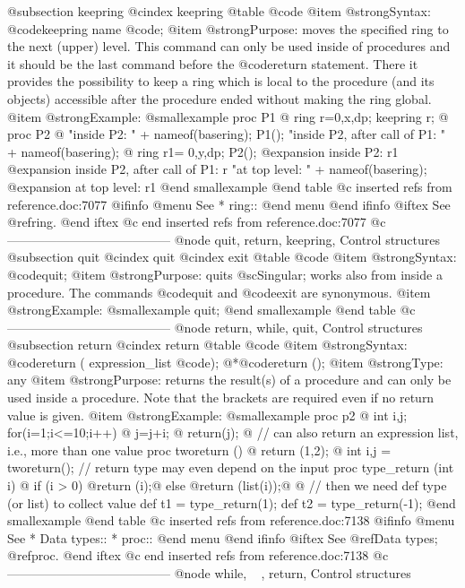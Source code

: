 {{{{{{{{@subsection keepring
@cindex keepring
@table @code
@item @strong{Syntax:}
@code{keepring} name @code{;}
@item @strong{Purpose:}
moves the specified ring to the next (upper) level. This command can only
be used inside of procedures and it should be the last command before the
@code{return} statement. There it provides the possibility to keep
a ring which is local to the procedure (and its objects) accessible after
the procedure ended without making the ring global.
@item @strong{Example:}
@smallexample
proc P1
@{
  ring r=0,x,dp;
  keepring r;
@}
proc P2
@{
  "inside P2: " + nameof(basering);
  P1();
  "inside P2, after call of P1: " + nameof(basering);
@}
ring r1= 0,y,dp;
P2();
@expansion{} inside P2: r1
@expansion{} inside P2, after call of P1: r
"at top level: " + nameof(basering);
@expansion{} at top level: r1
@end smallexample
@end table
@c inserted refs from reference.doc:7077
@ifinfo
@menu
See
* ring::
@end menu
@end ifinfo
@iftex
See
@ref{ring}.
@end iftex
@c end inserted refs from reference.doc:7077
@c ---------------------------------------
@node quit, return, keepring, Control structures
@subsection quit
@cindex quit
@cindex exit
@table @code
@item @strong{Syntax:}
@code{quit;}
@item @strong{Purpose:}
quits @sc{Singular};
works also from inside a procedure. The commands @code{quit} and
@code{exit} are synonymous.
@item @strong{Example:}
@smallexample
  quit;
@end smallexample
@end table
@c ---------------------------------------
@node return, while, quit, Control structures
@subsection return
@cindex return
@table @code
@item @strong{Syntax:}
@code{return (} expression_list @code{);}
@*@code{return ();}
@item @strong{Type:}
any
@item @strong{Purpose:}
returns the result(s) of a procedure and can only be used inside a
procedure. Note that the brackets are required even if no return value
is given.
@item @strong{Example:}
@smallexample
proc p2
@{
  int i,j;
  for(i=1;i<=10;i++)
  @{
    j=j+i;
  @}
  return(j);
@}
// can also return an expression list, i.e., more than one value
proc tworeturn ()
@{ return (1,2); @}
int i,j = tworeturn();
// return type may even depend on the input
proc type_return (int i)
@{
  if (i > 0) @{return (i);@}
  else @{return (list(i));@}
@}
// then we need def type (or list) to collect value
def t1 = type_return(1);
def t2 = type_return(-1);
@end smallexample
@end table
@c inserted refs from reference.doc:7138
@ifinfo
@menu
See
* Data types::
* proc::
@end menu
@end ifinfo
@iftex
See
@ref{Data types};
@ref{proc}.
@end iftex
@c end inserted refs from reference.doc:7138
@c ---------------------------------------
@node while, ~ , return, Control structures
}}}}}}}}
